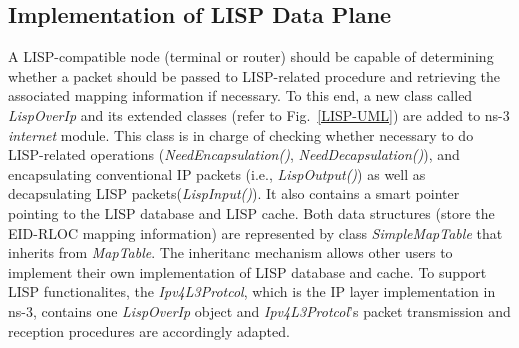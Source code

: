 \subsection{Implementation of LISP Data Plane}
\label{subsec:modifyInternet}
A LISP-compatible node (terminal or router) should be capable of determining whether a packet should be passed to LISP-related procedure and retrieving the associated mapping information if necessary. To this end, a new class called \emph{LispOverIp} and its extended classes (refer to Fig.~\ref{LISP-UML}) are added to ns-3 \emph{internet} module. This class is in charge of checking whether necessary to do LISP-related operations (\emph{NeedEncapsulation()}, \emph{NeedDecapsulation()}), and encapsulating conventional IP packets (i.e., \emph{LispOutput()}) as well as decapsulating LISP packets(\emph{LispInput()}). It also contains a smart pointer pointing to the LISP database and LISP cache. Both data structures (store the EID-RLOC mapping information) are represented by class \emph{SimpleMapTable} that inherits from \emph{MapTable}. The inheritanc mechanism allows other users to implement their own implementation of LISP database and cache. To support LISP functionalites, the \emph{Ipv4L3Protcol}, which is the IP layer implementation in ns-3, contains one \emph{LispOverIp} object and \emph{Ipv4L3Protcol}'s packet transmission and reception procedures are accordingly adapted.

